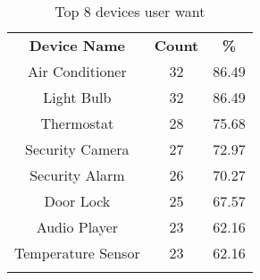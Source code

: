 \begin{table}[t]
\centering
\scriptsize
\caption{{\small Top 8 devices user want}}
\label{tbl:top-8-devices}
\begin{tabular}{c|c|c}
\Xhline{2\arrayrulewidth}
{\bf Device Name}& {\bf Count}& {\bf \%}\\
\Xhline{2\arrayrulewidth}
Air Conditioner & 32 & 86.49\\
Light Bulb & 32 & 86.49\\
Thermostat & 28 & 75.68\\
Security Camera & 27 & 72.97\\
Security Alarm & 26 & 70.27\\
Door Lock & 25 & 67.57\\
Audio Player & 23 & 62.16\\
Temperature Sensor & 23 & 62.16\\
\Xhline{2\arrayrulewidth}
\Xhline{2\arrayrulewidth}
\end{tabular}
\end{table}
